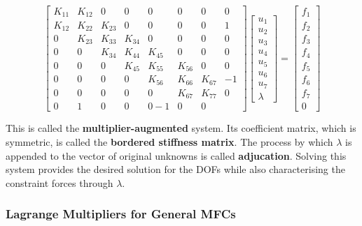 \begin{equation}
    \begin{bmatrix}
        K_{11} & K_{12} & 0 & 0 & 0 & 0 & 0 & 0 \\
        K_{12} & K_{22} & K_{23} & 0 & 0 & 0 & 0 & 1 \\
        0 & K_{23} & K_{33} & K_{34} & 0 & 0 & 0 & 0 \\
        0 & 0 & K_{34} & K_{44} & K_{45} & 0 & 0 & 0 \\
        0 & 0 & 0 & K_{45} & K_{55} & K_{56} & 0 & 0 \\
        0 & 0 & 0 & 0 & K_{56} & K_{66} & K_{67} & -1 \\
        0 & 0 & 0 & 0 & 0 & K_{67} & K_{77} & 0 \\
        0 & 1 & 0 & 0 & 0 -1 & 0 & 0
    \end{bmatrix}
    \begin{bmatrix}
        u_1 \\
        u_2 \\
        u_3 \\
        u_4 \\
        u_5 \\
        u_6 \\
        u_7 \\
        \lambda
    \end{bmatrix}
    = \begin{bmatrix}
        f_1 \\
        f_2 \\
        f_3 \\
        f_4 \\
        f_5 \\
        f_6 \\
        f_7 \\
        0
    \end{bmatrix}
\end{equation}

This is called the \textbf{multiplier-augmented} system. Its coefficient matrix,
which is symmetric, is called the \textbf{bordered stiffness matrix}. The
process by which $ \lambda $ is appended to the vector of original unknowns
is called \textbf{adjucation}. Solving this system provides the desired solution
for the DOFs while also characterising the constraint forces through
$ \lambda $.


\subsubsection{Lagrange Multipliers for General MFCs}

